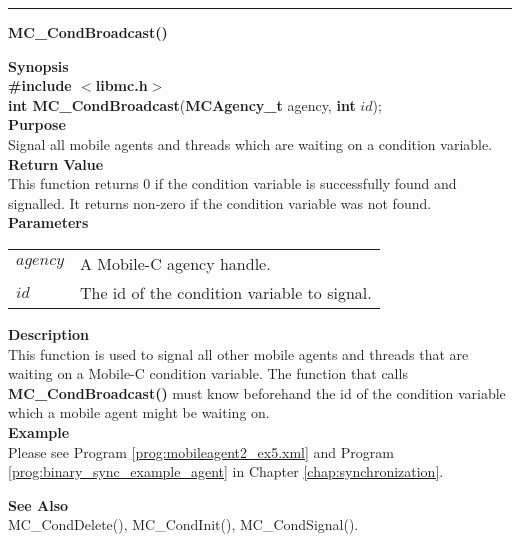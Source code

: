 \noindent
\vspace{5pt}
\rule{6.5in}{0.015in}
\noindent
{}
{\LARGE \bf MC\_CondBroadcast()}\\

\noindent
{\bf Synopsis}\\
{\bf \#include $<$libmc.h$>$}\\
{\bf int MC\_CondBroadcast}({\bf MCAgency\_t} agency, {\bf int} $id$);\\

\noindent
{\bf Purpose}\\
Signal all mobile agents and threads which are waiting on a condition 
variable.\\

\noindent
{\bf Return Value}\\
This function returns 0 if the condition variable is successfully found and 
signalled.
It returns non-zero if the condition variable was not found.\\

\noindent
{\bf Parameters}
\vspace{-0.1in}
\begin{description}
\item
\begin{tabular}{p{10 mm}p{145 mm}}
$agency$ & A Mobile-C agency handle. \\
$id$ & The id of the condition variable to signal.
\end{tabular}
\end{description}

\noindent
{\bf Description}\\
This function is used to signal all other mobile agents and threads that are 
waiting on a Mobile-C condition variable. 
The function that calls {\bf MC\_CondBroadcast()} must know beforehand the id of 
the condition variable which a mobile agent might be waiting on.\\

\noindent
{\bf Example}\\
Please see Program \vref{prog:mobileagent2_ex5.xml} and 
Program \vref{prog:binary_sync_example_agent} in Chapter 
\ref{chap:synchronization}.
\noindent

\noindent
{\bf See Also}\\
MC\_CondDelete(), MC\_CondInit(), MC\_CondSignal().\\

